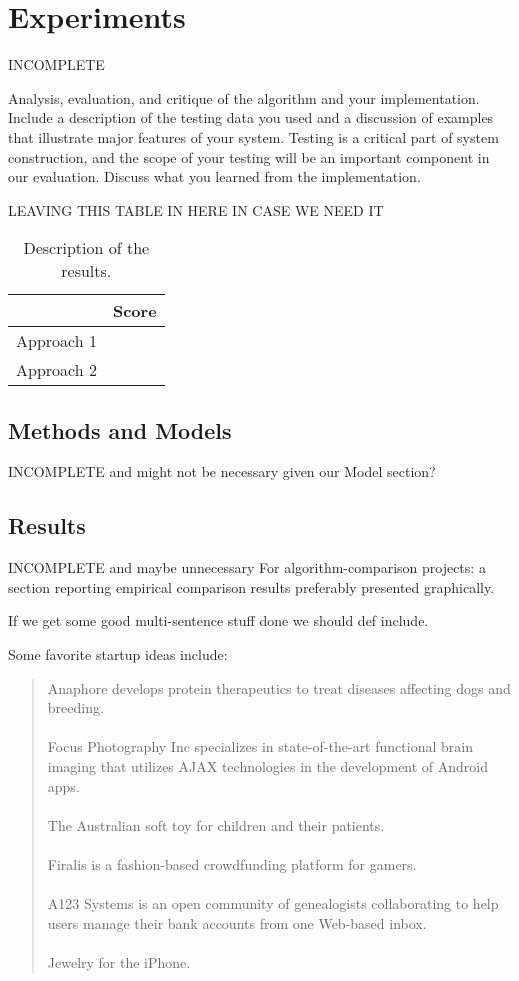\documentclass[11pt]{article}
\begin{document}
\section{Experiments}
INCOMPLETE

Analysis, evaluation, and critique of the algorithm and your
implementation. Include a description of the testing data you used and
a discussion of examples that illustrate major features of your
system. Testing is a critical part of system construction, and the
scope of your testing will be an important component in our
evaluation. Discuss what you learned from the implementation.

LEAVING THIS TABLE IN HERE IN CASE WE NEED IT
\begin{table}
  \centering
  \begin{tabular}{ll}
    \toprule
    & Score \\
    \midrule
    Approach 1 & \\
    Approach 2 & \\
    \bottomrule
  \end{tabular}
  \caption{Description of the results.}
\end{table}

\subsection{Methods and Models}
INCOMPLETE and might not be necessary given our Model section?

\subsection{Results}
INCOMPLETE and maybe unnecessary
For algorithm-comparison projects: a section reporting empirical comparison results preferably presented graphically.

If we get some good multi-sentence stuff done we should def include.

Some favorite startup ideas include:
\begin{quote}
Anaphore develops protein therapeutics to treat diseases affecting dogs and breeding.\\\\
Focus Photography Inc specializes in state-of-the-art functional brain imaging that utilizes AJAX technologies in the development of Android apps.\\\\
The Australian soft toy for children and their patients.\\\\
Firalis is a fashion-based crowdfunding platform for gamers.\\\\
A123 Systems is an open community of genealogists collaborating to help users manage their bank accounts from one Web-based inbox.\\\\
Jewelry for the iPhone.
\end{quote}
\end{document}

